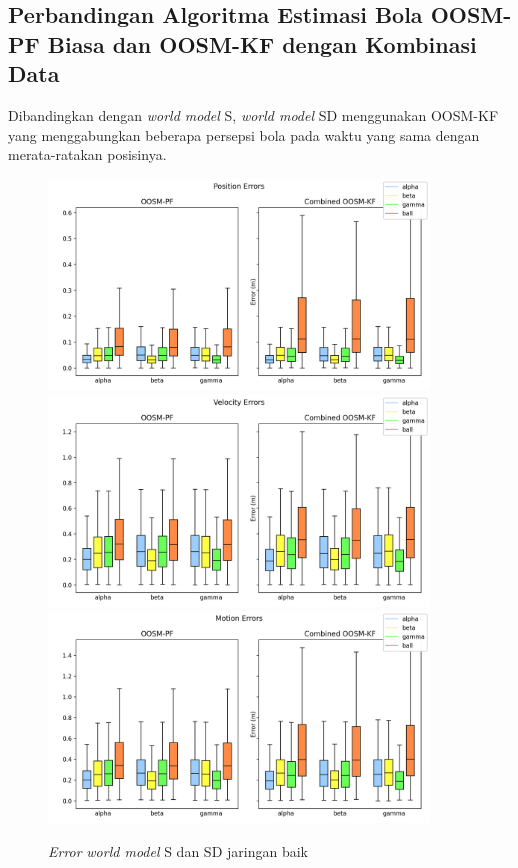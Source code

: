 \subsection{Perbandingan Algoritma Estimasi Bola OOSM-PF Biasa dan OOSM-KF dengan Kombinasi Data}

Dibandingkan dengan \textit{world model} S, \textit{world model} SD menggunakan OOSM-KF yang menggabungkan beberapa persepsi bola pada waktu yang sama dengan merata-ratakan posisinya.

\begin{figure}[p]
    \centering
    \medskip
    \includegraphics[width=0.9\textwidth]{resources/cfg1_AS_ASD_error_pos.png}
    \includegraphics[width=0.9\textwidth]{resources/cfg1_AS_ASD_error_vel.png}
    \includegraphics[width=0.9\textwidth]{resources/cfg1_AS_ASD_error_motion.png}
    \caption{\textit{Error} \textit{world model} S dan SD jaringan baik}
    \label{fig:1-s-sd-error}
    \bigskip
\end{figure}

